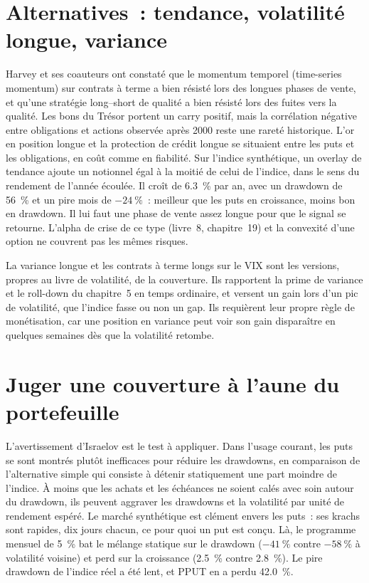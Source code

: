 \section{Alternatives~: tendance, volatilité longue, variance}

Harvey et ses coauteurs ont constaté que le momentum temporel (time-series momentum) sur contrats à terme a bien résisté lors des longues phases de vente, et qu'une stratégie long--short de qualité a bien résisté lors des
fuites vers la qualité. Les bons du Trésor portent un carry positif, mais la corrélation négative entre obligations et actions observée après 2000 reste une rareté historique. L'or en position longue et la
protection de crédit longue se situaient entre les puts et les obligations, en coût comme en fiabilité. Sur l'indice synthétique, un overlay de tendance ajoute un notionnel égal à la moitié de celui de l'indice, dans le
sens du rendement de l'année écoulée. Il croît de 6.3~\% par an, avec un drawdown de 56~\% et un pire mois de $-24~\%$~: meilleur que les puts en croissance,
moins bon en drawdown. Il lui faut une phase de vente assez longue pour que le signal se retourne. L'alpha de crise de ce type (livre~8, chapitre~19) et
la convexité d'une option ne couvrent pas les mêmes risques.

La variance longue et les contrats à terme longs sur le VIX sont les versions, propres au livre de volatilité, de la couverture. Ils rapportent la prime de variance et le roll-down du chapitre~5 en
temps ordinaire, et versent un gain lors d'un pic de volatilité, que l'indice fasse ou non un gap. Ils requièrent leur propre règle de monétisation, car une position en variance
peut voir son gain disparaître en quelques semaines dès que la volatilité retombe.

\section{Juger une couverture à l'aune du portefeuille}

L'avertissement d'Israelov est le test à appliquer. Dans l'usage courant, les puts se sont montrés plutôt inefficaces pour réduire les drawdowns, en comparaison de l'alternative simple
qui consiste à détenir statiquement une part moindre de l'indice. À moins que les achats et les échéances ne soient calés avec soin autour du drawdown, ils peuvent aggraver les drawdowns et la
volatilité par unité de rendement espéré. Le marché synthétique est clément envers les puts~: ses krachs sont rapides, dix jours chacun, ce pour quoi un put est
conçu. Là, le programme mensuel de 5~\% bat le mélange statique sur le drawdown ($-41~\%$ contre $-58~\%$ à volatilité voisine) et perd sur la croissance (2.5~\% contre
2.8~\%). Le pire drawdown de l'indice réel a été lent, et PPUT en a perdu 42.0~\%.

